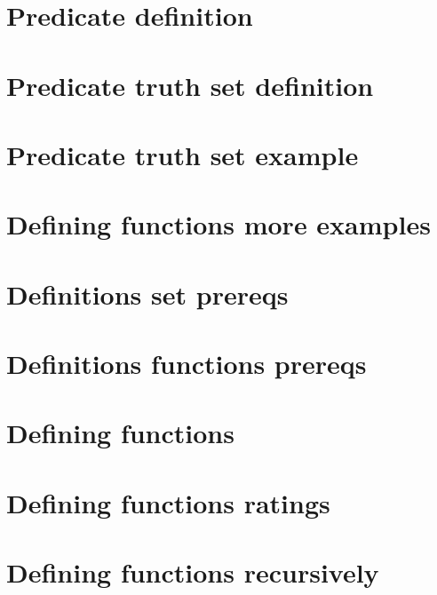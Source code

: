 
\section*{Predicate definition}

\vfill
\section*{Predicate truth set definition}

\vfill
\section*{Predicate truth set example}

\vfill
\section*{Defining functions more examples}

\vfill
\section*{Definitions set prereqs}

\vfill
\section*{Definitions functions prereqs}

\vfill
\section*{Defining functions}

\vfill
\section*{Defining functions ratings}

\vfill
\section*{Defining functions recursively}

\vfill
